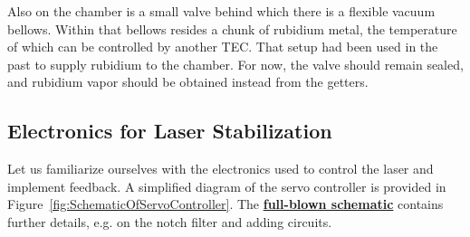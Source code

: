 \documentclass{../lab}
\begin{document}
\begin{itemize}
    Also on the chamber is a small valve behind which there is a flexible vacuum bellows.  Within that bellows resides a chunk of rubidium metal, the temperature of which can be controlled by another TEC.  That setup had been used in the past to supply rubidium to the chamber.  For now, the valve should remain sealed, and rubidium vapor should be obtained instead from the getters.
    
    



    
\end{itemize}

\subsection{Electronics for Laser Stabilization}

Let us familiarize ourselves with the electronics used to control the laser and implement feedback. A simplified diagram of the servo controller is provided in Figure~\ref{fig:SchematicOfServoController}. The \href{http://experimentationlab.berkeley.edu/sites/default/files/images/Full\_schematic.pdf}{\textbf{full-blown schematic}} contains further details, e.g. on the notch filter and adding circuits.
\end{document}
